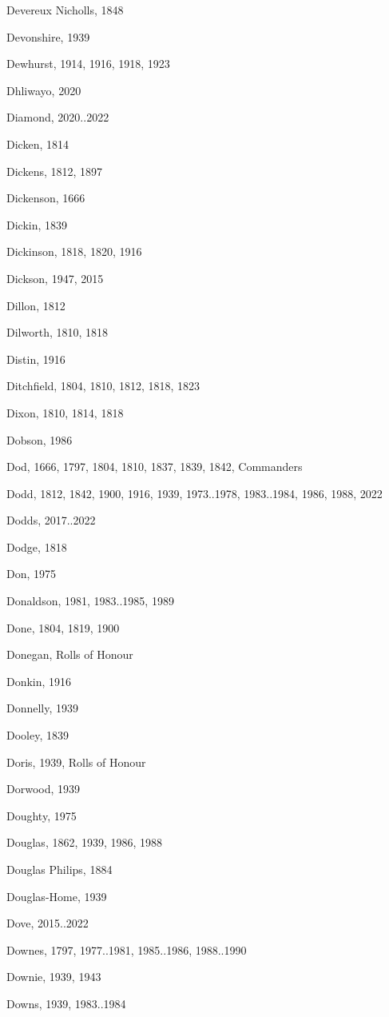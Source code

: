 \begin{theindex}
\item Devereux Nicholls, 1848
\item Devonshire, 1939
\item Dewhurst, 1914, 1916, 1918, 1923
\item Dhliwayo, 2020
\item Diamond, 2020..2022
\item Dicken, 1814
\item Dickens, 1812, 1897
\item Dickenson, 1666
\item Dickin, 1839
\item Dickinson, 1818, 1820, 1916
\item Dickson, 1947, 2015
\item Dillon, 1812
\item Dilworth, 1810, 1818
\item Distin, 1916
\item Ditchfield, 1804, 1810, 1812, 1818, 1823
\item Dixon, 1810, 1814, 1818
\item Dobson, 1986
\item Dod, 1666, 1797, 1804, 1810, 1837, 1839, 1842, Commanders
\item Dodd, 1812, 1842, 1900, 1916, 1939, 1973..1978, 1983..1984, 1986, 1988, 2022
\item Dodds, 2017..2022
\item Dodge, 1818
\item Don, 1975
\item Donaldson, 1981, 1983..1985, 1989
\item Done, 1804, 1819, 1900
\item Donegan, Rolls of Honour
\item Donkin, 1916
\item Donnelly, 1939
\item Dooley, 1839
\item Doris, 1939, Rolls of Honour
\item Dorwood, 1939
\item Doughty, 1975
\item Douglas, 1862, 1939, 1986, 1988
\item Douglas Philips, 1884
\item Douglas-Home, 1939
\item Dove, 2015..2022
\item Downes, 1797, 1977..1981, 1985..1986, 1988..1990
\item Downie, 1939, 1943
\item Downs, 1939, 1983..1984

\end{theindex}
